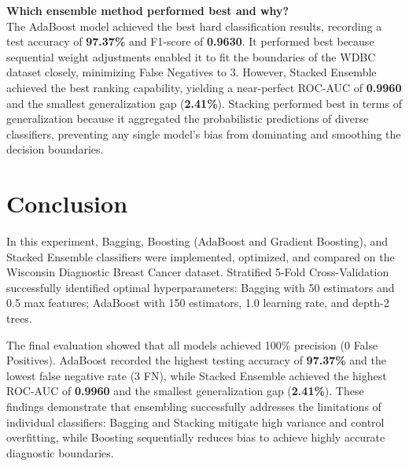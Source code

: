 \documentclass[12pt,a4paper]{article}
\begin{document}
\begin{enumerate}
    \textbf{Which ensemble method performed best and why?}\\
    The AdaBoost model achieved the best hard classification results, recording a test accuracy of \textbf{97.37\%} and F1-score of \textbf{0.9630}. It performed best because sequential weight adjustments enabled it to fit the boundaries of the WDBC dataset closely, minimizing False Negatives to 3. However, Stacked Ensemble achieved the best ranking capability, yielding a near-perfect ROC-AUC of \textbf{0.9960} and the smallest generalization gap (\textbf{2.41\%}). Stacking performed best in terms of generalization because it aggregated the probabilistic predictions of diverse classifiers, preventing any single model's bias from dominating and smoothing the decision boundaries.
\end{enumerate}

\section{Conclusion}
In this experiment, Bagging, Boosting (AdaBoost and Gradient Boosting), and Stacked Ensemble classifiers were implemented, optimized, and compared on the Wisconsin Diagnostic Breast Cancer dataset. Stratified 5-Fold Cross-Validation successfully identified optimal hyperparameters: Bagging with 50 estimators and 0.5 max features; AdaBoost with 150 estimators, 1.0 learning rate, and depth-2 trees.

The final evaluation showed that all models achieved 100\% precision (0 False Positives). AdaBoost recorded the highest testing accuracy of \textbf{97.37\%} and the lowest false negative rate (3 FN), while Stacked Ensemble achieved the highest ROC-AUC of \textbf{0.9960} and the smallest generalization gap (\textbf{2.41\%}). These findings demonstrate that ensembling successfully addresses the limitations of individual classifiers: Bagging and Stacking mitigate high variance and control overfitting, while Boosting sequentially reduces bias to achieve highly accurate diagnostic boundaries.
\end{document}
